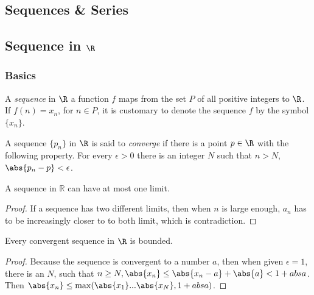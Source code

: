 \begin{refsection}
	
\startcontents[chapters]
\chapter{Sequences \& Series}\label{ch:sequences-series}

\section{Sequence in $\R$}
\subsection{Basics}
\begin{definition}[sequence]
A \emph{sequence} in $\R$ a function $f$ maps from the set $P$ of all positive integers to $\R$. If $f(n)=x_n$, for $n\in P$, it is customary to denote the sequence $f$ by the symbol $\{x_n\}$. \cite{johnsonbaugh2010foundations}
\end{definition}


\begin{definition}
A sequence $\{p_n\}$ in $\R$ is said to \emph{converge} if there is a point $p \in \R$ with the following property. For every $\epsilon >0$ there is an integer $N$ such that $n > N$,$\abs{p_n - p} < \epsilon$.
\end{definition}


\begin{theorem}\cite{johnsonbaugh2010foundations}
A sequence in $\mathbb{R}$ can have at most one limit. 
\end{theorem}
\begin{proof}
	If a sequence has two different limits, then when $n$ is large enough, $a_n$ has to be increasingly closer to to both limit, which is contradiction. 
\end{proof}
 

\begin{theorem}
Every convergent sequence in $\R$ is bounded.
\end{theorem}
\begin{proof}
	Because the sequence is convergent to a number $a$, then when given $\epsilon = 1$, there is an $N$, such that $n\geq N, \abs{x_n} \leq \abs{x_n-a} + \abs{a} < 1 + abs{a}$. Then $\abs{x_n} \leq \max(\abs{x_1}...\abs{x_N}, 1 + abs{a} )$.
\end{proof}





\end{refsection}
